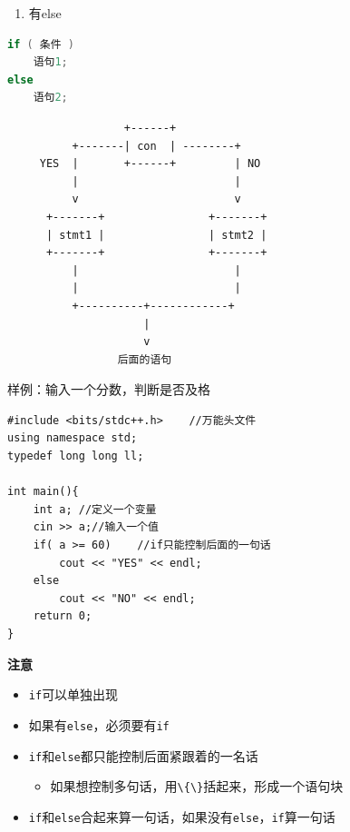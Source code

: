\documentclass[
  paper=a4,
  ,captions=tableheading
]{scrbook}
\newcommand{\passthrough}[1]{#1}
\providecommand{\tightlist}{%
  \setlength{\itemsep}{0pt}\setlength{\parskip}{0pt}}
\begin{document}
\begin{enumerate}
\def\labelenumi{\arabic{enumi}.}
\setcounter{enumi}{1}
\tightlist
\item
  有else
\end{enumerate}

\begin{lstlisting}[language={C++}]
if ( 条件 )
    语句1;
else
    语句2;
\end{lstlisting}

\begin{lstlisting}
                  +------+
          +-------| con  | --------+
     YES  |       +------+         | NO
          |                        |
          v                        v
      +-------+                +-------+
      | stmt1 |                | stmt2 |
      +-------+                +-------+
          |                        |
          |                        |
          +----------+------------+
                     |
                     v
                 后面的语句
\end{lstlisting}

样例：输入一个分数，判断是否及格

\begin{lstlisting}
#include <bits/stdc++.h>    //万能头文件
using namespace std;
typedef long long ll;

int main(){
    int a; //定义一个变量
    cin >> a;//输入一个值
    if( a >= 60)    //if只能控制后面的一句话
        cout << "YES" << endl;
    else
        cout << "NO" << endl;
    return 0;
}
\end{lstlisting}

\textbf{注意}

\begin{itemize}
\tightlist
\item
  \passthrough{\lstinline!if!}可以单独出现
\item
  如果有\passthrough{\lstinline!else!}，必须要有\passthrough{\lstinline!if!}
\item
  \passthrough{\lstinline!if!}和\passthrough{\lstinline!else!}都只能控制后面紧跟着的一名话

  \begin{itemize}
  \tightlist
  \item
    如果想控制多句话，用\passthrough{\lstinline!\{\}!}括起来，形成一个语句块
  \end{itemize}
\item
  \passthrough{\lstinline!if!}和\passthrough{\lstinline!else!}合起来算一句话，如果没有\passthrough{\lstinline!else!}，\passthrough{\lstinline!if!}算一句话
\end{itemize}
\end{document}
